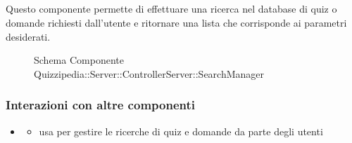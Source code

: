 \subsection{}
Questo componente permette di effettuare una ricerca nel database di quiz o domande richiesti dall'utente e ritornare una lista che corrisponde ai parametri desiderati.
\begin{figure}[H]
\centering
\noindent{}
\caption[Schema Componente Quizzipedia::Server::ControllerServer::SearchManager]{Schema Componente Quizzipedia::Server::ControllerServer::SearchManager}
\end{figure}
\subsubsection{Interazioni con altre componenti}
\begin{itemize}
\item {}
\begin{itemize}
\item usa  per gestire le ricerche di quiz e domande da parte degli utenti
\end{itemize}
\end{itemize}
